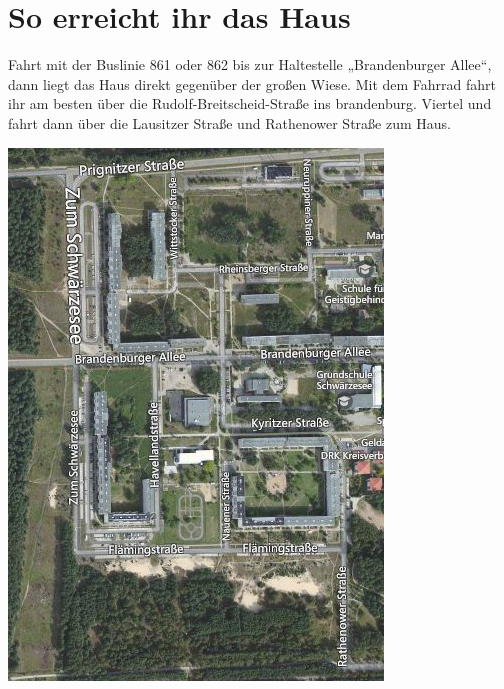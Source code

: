 \documentclass{leaflet}
\begin{document}
\clearpage
\section{So erreicht ihr das Haus}
Fahrt mit der Buslinie 861 oder 862 bis zur Haltestelle „Brandenburger Allee“, dann liegt das Haus direkt gegenüber der großen Wiese. Mit dem Fahrrad fahrt ihr am besten über die Rudolf-Breitscheid-Straße ins brandenburg. Viertel und fahrt dann über die Lausitzer Straße und Rathenower Straße zum Haus. 

\includegraphics[width=\textwidth]{havellandstrasse}
\end{document}
